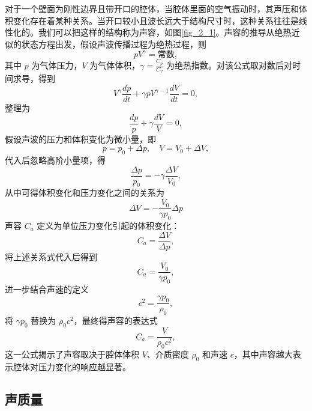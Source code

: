 对于一个壁面为刚性边界且带开口的腔体，当腔体里面的空气振动时，其声压和体积变化存在着某种关系。当开口较小且波长远大于结构尺寸时，这种关系往往是线性化的。我们可以把这样的结构称为声容，如图\ref{fig_2_1}。声容的推导从绝热近似的状态方程出发，假设声波传播过程为绝热过程，则
\begin{equation} \label{eq2-1}
  pV^\gamma = \text{常数},
\end{equation}
其中 \(p\) 为气体压力，\(V\) 为气体体积，\(\gamma = \frac{C_p}{C_v}\) 为绝热指数。对该公式取对数后对时间求导，得到
\begin{equation} \label{eq2-2}
  V^\gamma \frac{dp}{dt} + \gamma p V^{\gamma-1} \frac{dV}{dt} = 0,
\end{equation}
整理为
\begin{equation} \label{eq2-3}
  \frac{dp}{p} + \gamma \frac{dV}{V} = 0,
\end{equation}
假设声波的压力和体积变化为微小量，即
\begin{equation} \label{eq2-4}
  p = p_0 + \Delta p, \quad V = V_0 + \Delta V,
\end{equation}
代入后忽略高阶小量项，得
\begin{equation} \label{eq2-5}
  \frac{\Delta p}{p_0} = -\gamma \frac{\Delta V}{V_0},
\end{equation}
从中可得体积变化和压力变化之间的关系为
\begin{equation} \label{eq2-6}
  \Delta V = -\frac{V_0}{\gamma p_0} \Delta p
\end{equation}
声容 \(C_a\) 定义为单位压力变化引起的体积变化：
\begin{equation} \label{eq2-7}
  C_a = \frac{\Delta V}{\Delta p},
\end{equation}
将上述关系式代入后得到
\begin{equation} \label{eq2-8}
  C_a = \frac{V_0}{\gamma p_0},
\end{equation}
进一步结合声速的定义
\begin{equation} \label{eq2-9}
  c^2 = \frac{\gamma p_0}{\rho_0},
\end{equation}
将 \(\gamma p_0\) 替换为 \(\rho_0 c^2\)，最终得声容的表达式
\begin{equation} \label{eq2-10}
  C_a = \frac{V}{\rho_0 c^2},
\end{equation}
这一公式揭示了声容取决于腔体体积 \(V\)、介质密度 \(\rho_0\) 和声速 \(c\)，其中声容越大表示腔体对压力变化的响应越显著。

\subsection{声质量}

